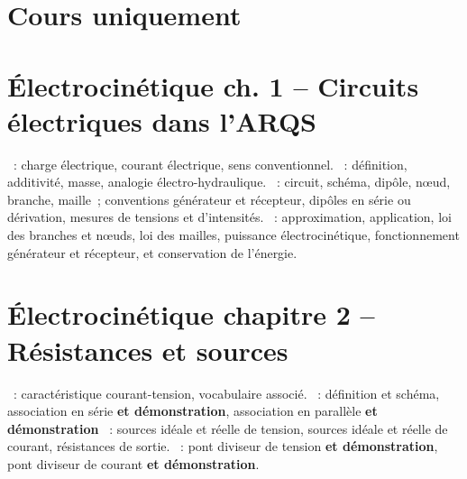 \documentclass[a4paper, 12pt, final, garamond]{book}
\begin{document}
\section{Cours uniquement}

\section*{Électrocinétique ch. 1 -- Circuits électriques dans l'ARQS}
\begin{enumerate}[label=\Roman*]
    ~: charge électrique, courant
        électrique, sens conventionnel.
    ~: définition, additivité, masse, analogie
        électro-hydraulique.
    ~: circuit, schéma,
        dipôle, nœud, branche, maille~; conventions générateur et récepteur,
        dipôles en série ou dérivation, mesures de tensions et d'intensités.
    ~:
        approximation, application, loi des branches et nœuds, loi des mailles,
        puissance électrocinétique, fonctionnement générateur et récepteur, et
        conservation de l'énergie.
\end{enumerate}

\section*{Électrocinétique chapitre 2 -- Résistances et sources}
\begin{enumerate}[label=\Roman*]
    ~: caractéristique courant-tension,
        vocabulaire associé.
    ~: définition et schéma, association en série
        \textbf{et démonstration}, association en parallèle \textbf{et
        démonstration}
    ~: sources idéale et réelle de tension, sources idéale
        et réelle de courant, résistances de sortie.
    ~: pont diviseur de tension \textbf{et
        démonstration}, pont diviseur de courant \textbf{et démonstration}.
\end{enumerate}
\end{document}
